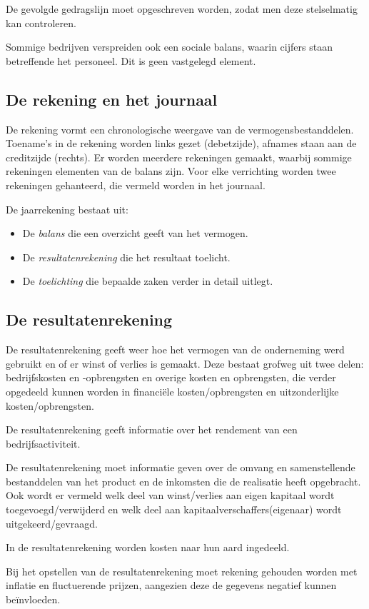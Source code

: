 \documentclass[../../samenvatting.tex]{subfiles}
\begin{document}
De gevolgde gedragslijn moet opgeschreven worden, zodat men deze stelselmatig kan controleren.

Sommige bedrijven verspreiden ook een sociale balans, waarin cijfers staan betreffende het personeel. Dit is geen vastgelegd element.

\subsection{De rekening en het journaal}

De rekening vormt een chronologische weergave van de vermogensbestanddelen. Toename's in de rekening worden links gezet (debetzijde), afnames staan aan de creditzijde (rechts). Er worden meerdere rekeningen gemaakt, waarbij sommige rekeningen elementen van de balans zijn. Voor elke verrichting worden twee rekeningen gehanteerd, die vermeld worden in het journaal.

De jaarrekening bestaat uit:
\begin{itemize}
    \item De \emph{balans} die een overzicht geeft van het vermogen.
    \item De \emph{resultatenrekening} die het resultaat toelicht.
    \item De \emph{toelichting} die bepaalde zaken verder in detail uitlegt.
\end{itemize}

\subsection{De resultatenrekening}
De resultatenrekening geeft weer hoe het vermogen van de onderneming werd gebruikt en of er winst of verlies is gemaakt. Deze bestaat grofweg uit twee delen: bedrijfskosten en -opbrengsten en overige kosten en opbrengsten, die verder opgedeeld kunnen worden in financiële kosten/opbrengsten en uitzonderlijke kosten/opbrengsten.

De resultatenrekening geeft informatie over het rendement van een bedrijfsactiviteit.

De resultatenrekening moet informatie geven over de omvang en samenstellende bestanddelen van het product en de inkomsten die de realisatie heeft opgebracht. Ook wordt er vermeld welk deel van winst/verlies aan eigen kapitaal wordt toegevoegd/verwijderd en welk deel aan kapitaalverschaffers(eigenaar) wordt uitgekeerd/gevraagd.

In de resultatenrekening worden kosten naar hun aard ingedeeld. 

Bij het opstellen van de resultatenrekening moet rekening gehouden worden met inflatie en fluctuerende prijzen, aangezien deze de gegevens negatief kunnen beïnvloeden.
\end{document}
